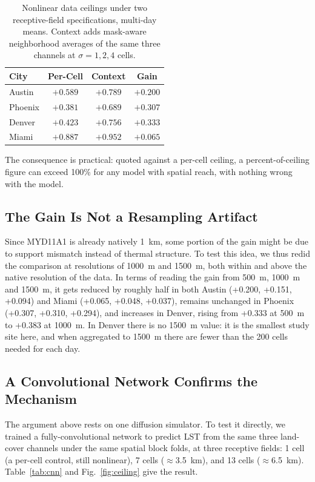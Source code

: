 \begin{table}[htbp]
\caption{Nonlinear data ceilings under two receptive-field specifications,
multi-day means. Context adds mask-aware neighborhood averages of the
same three channels at $\sigma=1,2,4$ cells.}
\begin{center}
\begin{tabular}{lccc}
\toprule
City & Per-Cell & Context & Gain \\
\midrule
Austin  & $+0.589$ & $+0.789$ & $+0.200$ \\
Phoenix & $+0.381$ & $+0.689$ & $+0.307$ \\
Denver  & $+0.423$ & $+0.756$ & $+0.333$ \\
Miami   & $+0.887$ & $+0.952$ & $+0.065$ \\
\bottomrule
\end{tabular}
\label{tab:receptive}
\end{center}
\end{table}

The consequence is practical: quoted against a per-cell ceiling, a
percent-of-ceiling figure can exceed 100\% for any model with spatial
reach, with nothing wrong with the model.

\subsection{The Gain Is Not a Resampling Artifact}
\label{sec:coarsen}

Since MYD11A1 is already natively 1~km, some portion of the gain might be due to support mismatch instead of thermal structure. To test this idea, we thus redid the comparison at resolutions of 1000~m and 1500~m, both within and above the native resolution of the data. In terms of reading the gain from 500~m, 1000~m and 1500~m, it gets reduced by roughly half in both Austin (+0.200, +0.151, +0.094) and Miami (+0.065, +0.048, +0.037), remains unchanged in Phoenix (+0.307, +0.310, +0.294), and increases in Denver, rising from +0.333 at 500~m to +0.383 at 1000~m. In Denver there is no 1500~m value: it is the smallest study site here, and when aggregated to 1500~m there are fewer than the 200 cells needed for each day.


\subsection{A Convolutional Network Confirms the Mechanism}

The argument above rests on one diffusion simulator. To test it directly,
we trained a fully-convolutional network to predict LST from the same
three land-cover channels under the same spatial block folds, at three
receptive fields: 1 cell (a per-cell control, still nonlinear), 7 cells
($\approx$3.5~km), and 13 cells ($\approx$6.5~km).
Table~\ref{tab:cnn} and Fig.~\ref{fig:ceiling} give the result.

